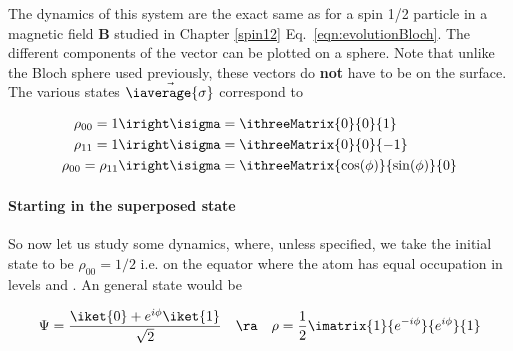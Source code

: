  \noindent The dynamics of this system are the exact same as for a spin 1/2 particle in a magnetic field \textbf{B} studied in Chapter \ref{spin12} Eq.~\eqref{eqn:evolutionBloch}. The different components of the vector \isigma can be plotted on a sphere. Note that unlike the Bloch sphere used previously, these vectors do \textbf{not} have to be on the surface. The various states $ \vec{\iaverage{\sigma}} $ correspond to
  
  \begin{align}
  	\rho_{00}=1 & \iright \isigma = \ithreeMatrix{0}{0}{1}\\
  	\rho_{11}=1 & \iright \isigma = \ithreeMatrix{0}{0}{-1}\\
  	\rho_{00}=\rho_{11}&\iright\isigma = \ithreeMatrix{\cos(\phi)}{\sin(\phi)}{0}
  \end{align}
  
  \begin{figure}[h]
  \end{figure}

	\newpage
	
 \paragraph{Starting in the superposed state}
 
 So now let us study some dynamics, where, unless specified, we take the initial state to be $ \rho_{00}=1/2 $ i.e. on the equator where the atom has equal occupation in levels  and . An general state would be
 
 \[
 	\Psi = \frac{\iket{0}+e^{i\phi}\iket{1}}{\sqrt{2}} \quad\ra\quad \rho = \frac{1}{2}\imatrix{1}{e^{-i\phi}}{e^{i\phi}}{1}
 \]
 
